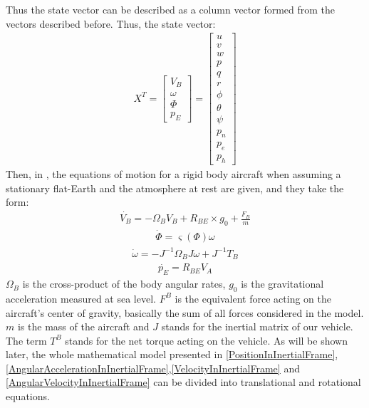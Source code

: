 \documentclass[conference]{IEEEtran}
\begin{document}
\par
Thus the state vector can be described as a column vector formed from the
vectors described before. Thus, the state vector:
\begin{align}
    X^T={\begin{bmatrix}
             V_B     \\
             \omega  \\
             \varPhi \\
             p_E
         \end{bmatrix}}
        ={\begin{bmatrix}
                  u      \\
                  v      \\
                  w      \\
                  p      \\
                  q      \\
                  r      \\
                  \phi   \\
                  \theta \\
                  \psi   \\
                  p_n    \\
                  p_e    \\
                  p_h
              \end{bmatrix}}
\end{align}
Then, in {\cite{Equations_of_Motion}}, the equations of motion for a rigid body aircraft when assuming a stationary flat-Earth and the atmosphere at rest are given, and they take the form:
\begin{align}
    {\dot{V_B}}={-{\Omega_B}{V_B}+R_{BE}\times{g_0}+\frac{F_B}{m}}
    \label{VelocityInInertialFrame}
\end{align}
\begin{align}
    {\dot{\varPhi}}={\varsigma(\varPhi)\omega}
    \label{AngularAccelerationInInertialFrame}
\end{align}
\begin{align}
    {\dot{\omega}}={-{J}^{-1}{\Omega_B}{J}\omega+J^{-1}T_B}
    \label{AngularVelocityInInertialFrame}
\end{align}
\begin{align}
    {\dot{p_E}}={R_{BE}V_A}
    \label{PositionInInertialFrame}
\end{align}
$\Omega_B$ is the cross-product of the body angular rates, $g_0$ is the gravitational acceleration measured at sea level.
$F^B$ is the equivalent force acting on the aircraft's center of gravity, basically the sum of all forces considered in the model.
$m$ is the mass of the aircraft and $J$ stands for the inertial matrix of our vehicle.
The term $T^B$ stands for the net torque acting on the vehicle.
As will be shown later, the whole mathematical model presented in {\ref{PositionInInertialFrame}},{\ref{AngularAccelerationInInertialFrame}},{\ref{VelocityInInertialFrame}} and {\ref{AngularVelocityInInertialFrame}} can be divided into translational and rotational equations.
\end{document}
